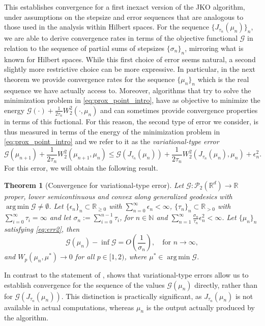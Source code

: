 \documentclass[11pt]{article}
\DeclareMathOperator*{\argmin}{arg\,min}
\newtheorem{theorem}{Theorem}[section]
\newcommand{\cP}{\mathcal{P}}
\newcommand{\cG}{\mathcal{G}}
\newcommand{\R}{\mathbb{R}}
\numberwithin{equation}{section}
\begin{document}
This establishes convergence for a first inexact version of the JKO algorithm, under assumptions on the stepsize and error sequences that are analogous to those used in the analysis within Hilbert spaces. For the sequence $\{J_{\tau_n}(\mu_n)\}_n$, we are able to derive convergence rates in terms of the objective functional $\cG$ in relation to the sequence of partial sums of stepsizes $\{\sigma_n\}_n$, mirroring what is known for Hilbert spaces. While this first choice of error seems natural, a second slightly more restrictive choice can be more expressive. In particular, in the next theorem we provide convergence rates for the sequence $\{\mu_n\}_n$ which is the real sequence we have actually access to. Moreover, algorithms that try to solve the minimization problem in \eqref{eq:prox_point_intro}, have as objective to minimize the energy $\cG(\cdot) + \frac{1}{2\tau_n}W_2^2(\cdot, \mu_n)$ and can sometimes provide convergence properties in terms of this fuctional. For this reason, the second type of error we consider, is thus measured in terms of the energy of the minimization problem in \eqref{eq:prox_point_intro} and we refer to it as the \emph{variational-type error}
\begin{equation}\label{eq:err2}
	\cG(\mu_{n+1}) + \frac{1}{2\tau_n} W_2^2(\mu_{n+1}, \mu_n) \leq \cG(J_{\tau_n}(\mu_n)) + \frac{1}{2\tau_n} W_2^2(J_{\tau_n}(\mu_n), \mu_n) + \epsilon_n^2.
\end{equation}
For this error, we will obtain the following result.
\begin{theorem}[Convergence for variational-type error]\label{thm:JKO_intro_convergence2}
	Let $\cG : \cP_2(\R^d) \to \mathbb{R} \ $ proper, lower semicontinuous and convex along generalized geodesics with $\argmin \cG \neq \emptyset$. Let $\{\epsilon_n\}_n\subset \mathbb{R}_{\geq 0}$ with $\sum_{n=0}^{\infty} \epsilon_n < \infty$, $\{\tau_n\}_n \subset \mathbb{R}_{> 0}$ with $\sum_{i=0}^{\infty}\tau_i= \infty$ and let $\sigma_n:= \sum_{i=0}^{n-1}\tau_i$, for $n\in\mathbb{N}$ and $\sum_{n=1}^{\infty}\frac{\sigma_n}{\tau_n}\epsilon_{n}^2  < \infty$. Let $\{\mu_n\}_n$ satisfying \eqref{eq:err2}, then
	\[\cG(\mu_n)-\inf \cG = O\left(\frac{1}{\sigma_n}\right), \quad \text{for } n\to \infty,\]
	and $W_p(\mu_n,\mu^*)\to 0$ for all $p\in [1,2)$, where $\mu^*\in \argmin \cG$.
\end{theorem}
In contrast to the statement  
of ,  shows that variational-type errors allow us to establish convergence for the sequence of the values $\cG(\mu_n)$ directly, rather than for $\cG(J_{\tau_n}(\mu_n))$. This distinction is practically significant, as $J_{\tau_n}(\mu_n)$  is not available in actual computations, whereas $\mu_n$
is the output actually produced by the algorithm.
\end{document}
